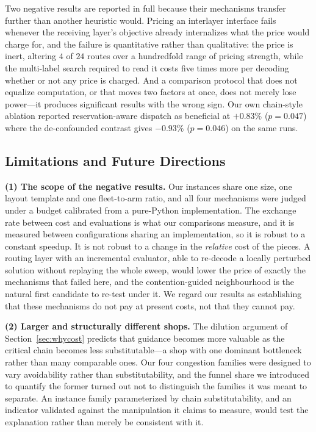 \documentclass[manuscript,screen,review]{acmart}
\begin{document}
Two negative results are reported in full because their mechanisms transfer
further than another heuristic would. Pricing an interlayer interface fails
whenever the receiving layer's objective already internalizes what the price would
charge for, and the failure is quantitative rather than qualitative: the price is
inert, altering $4$ of $24$ routes over a hundredfold range of pricing strength,
while the multi-label search required to read it costs five times more per
decoding whether or not any price is charged. And a comparison protocol that does
not equalize computation, or that moves two factors at once, does not merely lose
power---it produces significant results with the wrong sign. Our own chain-style
ablation reported reservation-aware dispatch as beneficial at $+0.83\%$
($p=0.047$) where the de-confounded contrast gives $-0.93\%$ ($p=0.046$) on the
same runs.

\subsection{Limitations and Future Directions}
\label{sec:future_work}

\textbf{(1) The scope of the negative results.} Our instances share one size, one
layout template and one fleet-to-arm ratio, and all four mechanisms were judged
under a budget calibrated from a pure-Python implementation. The exchange rate
between cost and evaluations is what our comparisons measure, and it is measured
between configurations sharing an implementation, so it is robust to a constant
speedup. It is not robust to a change in the \emph{relative} cost of the pieces. A
routing layer with an incremental evaluator, able to re-decode a locally perturbed
solution without replaying the whole sweep, would lower the price of exactly the
mechanisms that failed here, and the contention-guided neighbourhood is the
natural first candidate to re-test under it. We regard our results as
establishing that these mechanisms do not pay at present costs, not that they
cannot pay.

\textbf{(2) Larger and structurally different shops.} The dilution argument of
Section~\ref{sec:whycost} predicts that guidance becomes more valuable as the
critical chain becomes less substitutable---a shop with one dominant bottleneck
rather than many comparable ones. Our four congestion families were designed to
vary avoidability rather than substitutability, and the funnel share we introduced
to quantify the former turned out not to distinguish the families it was meant to
separate. An instance family parameterized by chain substitutability, and an
indicator validated against the manipulation it claims to measure, would test the
explanation rather than merely be consistent with it.
\end{document}
